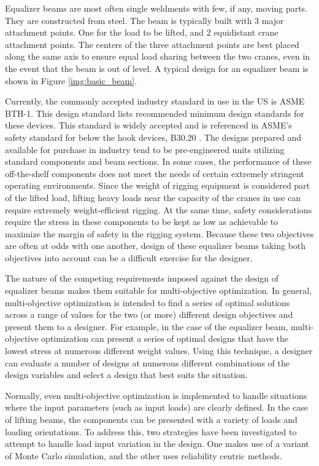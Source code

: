Equalizer beams are most often single weldments with few, if any, moving parts. They are constructed from steel. The beam is typically built with 3 major attachment points. One for the load to be lifted, and 2 equidistant crane attachment points. The centers of the three attachment points are best placed along the same axis to ensure equal load sharing between the two cranes, even in the event that the beam is out of level. A typical design for an equalizer beam is shown in Figure \ref{img:basic_beam}. 

Currently, the commonly accepted industry standard in use in the US is ASME BTH-1\cite{asme-bth-1}. This design standard lists recommended minimum design standards for these devices. This standard is widely accepted and is referenced in ASME's safety standard for below the hook devices, B30.20 \cite{asme-b30-20}. The designs prepared and available for purchase in industry tend to be pre-engineered units utilizing standard components and beam sections. In some cases, the performance of these off-the-shelf components does not meet the needs of certain extremely stringent operating environments. Since the weight of rigging equipment is considered part of the lifted load, lifting heavy loads near the capacity of the cranes in use can require extremely weight-efficient rigging. At the same time, safety considerations require the stress in these components to be kept as low as achievable to maximize the margin of safety in the rigging system. Because these two objectives are often at odds with one another, design of these equalizer beams taking both objectives into account can be a difficult exercise for the designer. 

The nature of the competing requirements imposed against the design of equalizer beams makes them suitable for multi-objective optimization. In general, multi-objective optimization is intended to find a series of optimal solutions across a range of values for the two (or more) different design objectives and present them to a designer. For example, in the case of the equalizer beam, multi-objective optimization can present a series of optimal designs that have the lowest stress at numerous different weight values.  Using this technique, a designer can evaluate a number of designs at numerous different combinations of the design variables and select a design that best suits the situation. 

Normally, even multi-objective optimization is implemented to handle situations where the input parameters (such as input loads) are clearly defined. In the case of lifting beams, the components can be presented with a variety of loads and loading orientations. To address this, two strategies have been investigated to attempt to handle load input variation in the design. One makes use of a variant of Monte Carlo simulation, and the other uses reliability centric methods. 
